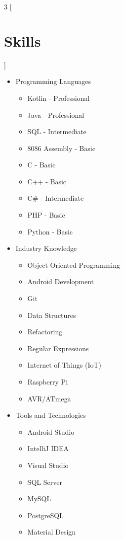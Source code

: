 \begin{multicols}{3}
[\section*{\LARGE{Skills}}]
    \begin{itemize}
        \item Programming Languages
        \begin{itemize}
            \item Kotlin - Professional
            \item Java - Professional
            \item SQL - Intermediate
            \item 8086 Assembly - Basic
            \item C - Basic
            \item C++ - Basic
            \item C\# - Intermediate
            \item PHP - Basic
            \item Python - Basic
        \end{itemize}
        \item Industry Knowledge
        \begin{itemize}
            \item Object-Oriented Programming
            \item Android Development
            \item Git
            \item Data Structures
            \item Refactoring
            \item Regular Expressions
            \item Internet of Things (IoT)
            \item Raspberry Pi
            \item AVR/ATmega
        \end{itemize}
        \item Tools and Technologies
        \begin{itemize}
            \item Android Studio
            \item IntelliJ IDEA
            \item Visual Studio
            \item SQL Server
            \item MySQL
            \item PostgreSQL
            \item Material Design
        \end{itemize}
    \end{itemize}
\end{multicols}